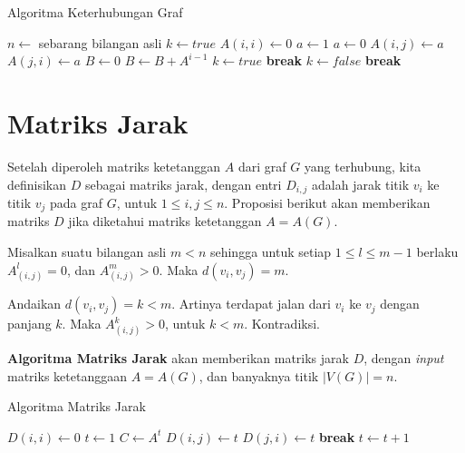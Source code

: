 \begin{algorithm}
	\label{alg:the_alg}
	\caption{Algoritma Keterhubungan Graf}
	\begin{algorithmic}[1]
		\State $n\gets$ sebarang bilangan asli 
		\State $k\gets true$
		\State $A(i,i)\gets0$
		\State $a\gets1$
		\Else
		\State $a\gets0$
		\EndIf
		\State $A(i,j)\gets a$
		\State $A(j,i)\gets a$
		\EndFor
		\EndFor
		\State $B\gets0$
		\State $B\gets B+A^{i-1}$
		\EndFor
		\State $k\gets true$
		\State \textbf{break}
		\Else
		\State $k\gets false$
		\EndIf
		\EndFor
		\State \textbf{break}
		\EndIf
		\EndFor
		\EndWhile
		\EndProcedure
	\end{algorithmic}
\end{algorithm}

\section{Matriks Jarak}
Setelah diperoleh matriks ketetanggan $A$ dari graf $G$ yang terhubung, kita definisikan $D$ sebagai matriks jarak, dengan entri $D_{i,j}$ adalah jarak titik $v_i$ ke titik $v_j$ pada graf $G$, untuk $1\le i,j\le n$. Proposisi berikut akan memberikan matriks $D$ jika diketahui matriks ketetanggan $A=A(G)$.
\begin{teorema}
	Misalkan suatu bilangan asli $m<n$ sehingga untuk setiap $1\le l\le m-1$ berlaku $A^l_{(i,j)}=0$, dan $A^m_{(i,j)}>0$. Maka $d(v_i,v_j)=m$.
\end{teorema}
\begin{pf}
	Andaikan $d(v_i,v_j)=k<m$. Artinya terdapat jalan dari $v_i$ ke $v_j$ dengan panjang $k$. Maka $A^k_{(i,j)}>0$, untuk $k<m$. Kontradiksi.
\end{pf}

\textbf{Algoritma Matriks Jarak} akan memberikan matriks jarak $D$, dengan \textit{input} matriks ketetanggaan $A=A(G)$, dan banyaknya titik $|V(G)|=n$.
\begin{algorithm}
	\caption{Algoritma Matriks Jarak}
	\begin{algorithmic}[1]
		\State $D(i,i)\gets0$
		\State $t\gets1$
		\State $C\gets A^t$
		\State $D(i,j)\gets t$
		\State $D(j,i)\gets t$
		\State \textbf{break}
		\Else
		\State $t\gets t+1$
		\EndIf
		\EndWhile
		\EndFor
		\EndFor
		\EndProcedure
	\end{algorithmic}
\end{algorithm}
$ $\\
